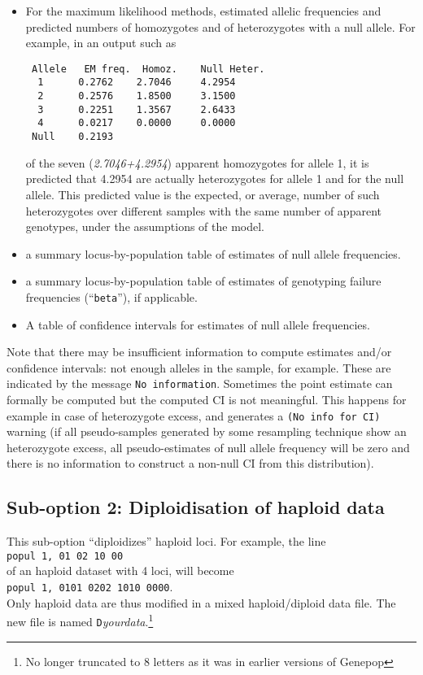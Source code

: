 \documentclass[12pt,]{book}
\let\rmarkdownfootnote\footnote%
\def\footnote{\protect\rmarkdownfootnote}
\theoremstyle{definition}
\theoremstyle{definition}
\theoremstyle{definition}
\theoremstyle{remark}
\begin{document}
\begin{itemize}
\item
  For the maximum likelihood methods, estimated allelic frequencies and
  predicted numbers of homozygotes and of heterozygotes with a null
  allele. For example, in an output such as

\begin{verbatim}
 Allele   EM freq.  Homoz.    Null Heter.
  1      0.2762    2.7046     4.2954
  2      0.2576    1.8500     3.1500
  3      0.2251    1.3567     2.6433
  4      0.0217    0.0000     0.0000
 Null    0.2193
\end{verbatim}

  of the seven (\emph{2.7046+4.2954}) apparent homozygotes for allele 1,
  it is predicted that 4.2954 are actually heterozygotes for allele 1
  and for the null allele. This predicted value is the expected, or
  average, number of such heterozygotes over different samples with the
  same number of apparent genotypes, under the assumptions of the model.
\item
  a summary locus-by-population table of estimates of null allele
  frequencies.
\item
  a summary locus-by-population table of estimates of genotyping failure
  frequencies (``\texttt{beta}''), if applicable.
\item
  A table of confidence intervals for estimates of null allele
  frequencies.
\end{itemize}

Note that there may be insufficient information to compute estimates
and/or confidence intervals: not enough alleles in the sample, for
example. These are indicated by the message \texttt{No\ information}.
Sometimes the point estimate can formally be computed but the computed
CI is not meaningful. This happens for example in case of heterozygote
excess, and generates a \texttt{(No\ info\ for\ CI)} warning (if all
pseudo-samples generated by some resampling technique show an
heterozygote excess, all pseudo-estimates of null allele frequency will
be zero and there is no information to construct a non-null CI from this
distribution).

\subsection{Sub-option 2: Diploidisation of haploid
data}\label{sub-option-2-diploidisation-of-haploid-data}

 This sub-option ``diploidizes'' haploid
loci. For example, the line\\
\texttt{popul\ 1,\ 01\ 02\ 10\ 00}\\
of an haploid dataset with 4 loci, will become\\
\texttt{popul\ 1,\ 0101\ 0202\ 1010\ 0000}.\\
Only haploid data are thus modified in a mixed haploid/diploid data
file. The new file is named \texttt{D}\emph{yourdata}.\footnote{No
  longer truncated to 8 letters as it was in earlier versions of Genepop}
\end{document}
